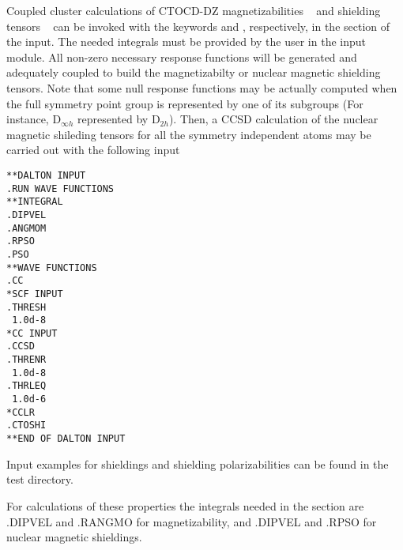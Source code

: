 

Coupled cluster calculations of CTOCD-DZ magnetizabilities
~\cite{pccpcctocd} and shielding tensors ~\cite{spas073, pccpcctocd}
can be invoked with the keywords  and ,
respectively, in the  section of the  input. The
needed integrals must be provided by the user in the 
input module. All non-zero necessary response functions will be
generated and adequately coupled to build the magnetizabilty or nuclear
magnetic shielding tensors. Note that some null response functions may
be actually computed when the full symmetry point group is represented
by one of its subgroups (For instance, D$_{\infty h}$ represented by
D$_{2h}$). Then, a CCSD calculation of the nuclear magnetic shileding
tensors for all the symmetry independent atoms may be carried out with
the following input


\begin{verbatim}
**DALTON INPUT
.RUN WAVE FUNCTIONS
**INTEGRAL
.DIPVEL
.ANGMOM
.RPSO
.PSO
**WAVE FUNCTIONS
.CC
*SCF INPUT
.THRESH
 1.0d-8
*CC INPUT
.CCSD
.THRENR
 1.0d-8
.THRLEQ
 1.0d-6
*CCLR
.CTOSHI
**END OF DALTON INPUT
\end{verbatim}



Input examples for shieldings and shielding polarizabilities can be found in
the test directory.

For  calculations of these properties the integrals needed in
the  section are .DIPVEL and .RANGMO for magnetizability, and .DIPVEL and .RPSO for
nuclear magnetic shieldings.
